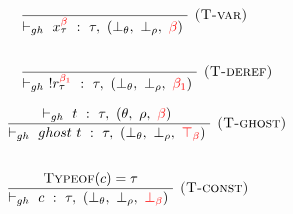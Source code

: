 \documentclass[a4paper,11pt,oneside]{article}
\theoremstyle{plain}
\newcommand{\rouge}[1]{\textcolor{red}{#1}}
\newcommand{\ghosttyping}[6]{\vdash_{gh}~#1~:~#2,~(#3,~#4,~\rouge{#5})~\textcolor{blue}{\boldsymbol{#6}}}
\newcommand{\bth}{\bot_\theta}
\newcommand{\brh}{\bot_\rho}
\newcommand{\gb}{\beta}
\newcommand{\gba}[1]{\beta_{#1}}
\newcommand{\gbb}{\bot_\beta}
\newcommand{\gbt}{\top_\beta}
\newcommand{\gbr}{\textcolor{red}{\gb}}
\newcommand{\gbra}[1]{\textcolor{red}{\gba{#1}}}
\newcommand{\gbbr}{\textcolor{red}{\gbb}}
\newcommand{\gbtr}{\textcolor{red}{\gbt}}
\begin{document}
\begin{footnotesize}
\begin{minipage}[t]{0.5\linewidth}
\begin{displaymath}
\begin{array}{l}
\dfrac
	{}
	{\ghosttyping{x^{\gbr}_{\tau}}{\tau}{\bot_{\theta}}{\bot_{\rho}}{\gbr}{}}
	{\textsc{  (T-var)}} \\[1cm]	
	
\dfrac
	{}
	{\ghosttyping{!r^{\gbra{1}}_{\tau}}{\tau}{\bth}{\brh}{\gbra{1}}{}} 
{\textsc{  (T-deref)}}	
\end{array}
\end{displaymath}
\end{minipage}
\begin{minipage}[t]{0.5\linewidth}
\begin{displaymath}
\begin{array}{l}
\dfrac
	{\ghosttyping
		{t}
		{\tau}
		{\theta}
		{\rho}
		{\gbr}
		{}}
	{\ghosttyping
		{ghost~t}
		{\tau}
		{\bth}
		{\brh}
		{\gbtr}
		{}} 
{\textsc{  (T-ghost)}}\\[1cm]		

\dfrac
	{\textsc{Typeof}(c) = \tau}
	{\ghosttyping{c}{\tau}{\bot_{\theta}}{\bot_{\rho}}{\gbbr}{}}
	{\textsc{  (T-const)}} 	

\end{array}	
\end{displaymath}
\end{minipage}
\end{footnotesize}	
~\\
\end{document}
